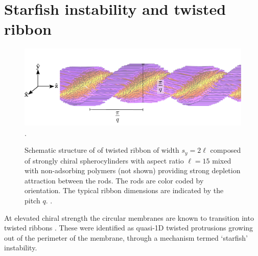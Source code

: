\section{Starfish instability and twisted ribbon}


\begin{figure}
\begin{center}
\includegraphics[width= \columnwidth]{figures/chapter-5/ribbon_sketch}.
\caption{ \label{ribsnap} Schematic structure of of twisted ribbon of width $s_y=2\ell$ composed of strongly chiral spherocylinders with aspect ratio $\ell = 15$ mixed with non-adsorbing polymers (not shown) providing strong depletion attraction between the rods. The rods are color coded by orientation. The typical  ribbon dimensions are indicated by the pitch $q$. . }
\end{center}
\end{figure}

At elevated chiral strength the circular membranes are known to transition into twisted ribbons \cite{Gibaud2012}. These were identified as quasi-1D twisted protrusions growing out of the perimeter of the membrane, through a mechanism termed `starfish' instability.


